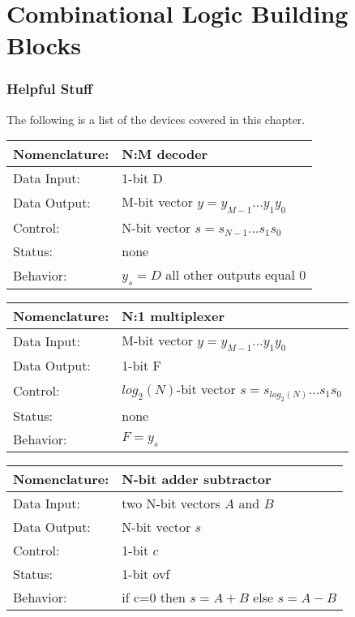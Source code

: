 \chapter{Combinational Logic Building Blocks}
\graphicspath{ {./chapter04/FigWork} }

\subsection{Helpful Stuff}
The following is a list of the devices covered in this chapter.

\begin{tabular}{|l|p{3.5in}|} \hline
Nomenclature:  & N:M decoder				\\ \hline
Data Input:    & 1-bit D		\\ \hline
Data Output:   & M-bit vector $y = y_{M-1} \ldots y_1 y_0$	\\ \hline
Control:       & N-bit vector $s = s_{N-1} \ldots s_1 s_0$	\\ \hline
Status:        & none					\\ \hline
Behavior:      & $y_s = D$ all other outputs equal 0	\\ \hline
\end{tabular}

\begin{tabular}{|l|p{3.5in}|} \hline
Nomenclature:  & N:1 multiplexer                        \\ \hline
Data Input:    & M-bit vector $y=y_{M-1} \ldots y_1 y_0$    \\ \hline
Data Output:   & 1-bit F          \\ \hline
Control:       & $log_2(N)$-bit vector $s = s_{log_2(N)} \ldots s_1 s_0$	\\ \hline
Status:        & none                                   \\ \hline
Behavior:      & $F = y_s$				\\ \hline
\end{tabular}


\begin{tabular}{|l|p{3.5in}|} \hline
Nomenclature:  & N-bit adder subtractor                 \\ \hline
Data Input:    & two N-bit vectors $A$ and $B$           \\ \hline  
Data Output:   & N-bit vector  $s$               \\ \hline
Control:       & 1-bit $c$                     \\ \hline
Status:        & 1-bit ovf 				\\ \hline
Behavior:      & if c=0 then $s = A+B$ else $s=A-B$     \\ \hline
\end{tabular}


